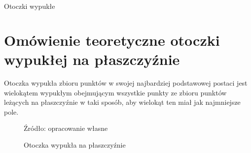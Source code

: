 \newcommand*{\includesDirectory}{includes}
\newcommand*{\settingsDirectory}{\includesDirectory/settings}
\newcommand*{\tikzDirectory}{\includesDirectory/tikz}
\newcommand*{\proovesDirectory}{\includesDirectory/prooves}
\newcommand*{\oneDirectory}{\proovesDirectory/one}
\newcommand*{\listingsDirectory}{\includesDirectory/listings}




















\newcommand{\alignspace}{\vspace{- 3pt}}
\setlength{\abovedisplayskip}{0ex}
\setlength{\belowdisplayskip}{0ex}
\setlength{\abovedisplayshortskip}{0ex}
\setlength{\belowdisplayshortskip}{0ex}
\setlength{\jot}{1.5ex}

    \thispagestyle{empty}
    \begin{center}
        \Huge{Otoczki wypukłe}
    \end{center}
    \tableofcontents	

  

    \chapter{Omówienie teoretyczne otoczki wypukłej na płaszczyźnie}
    Otoczka wypukła zbioru punktów w swojej najbardziej podstawowej postaci jest wielokątem wypukłym obejmującym wszystkie punkty ze zbioru punktów leżących na płaszczyźnie w taki sposób, aby wielokąt ten miał jak najmniejsze pole.    
    \begin{figure}[h!]
        	\begin{center}
    			
    			\caption{Otoczka wypukła na płaszczyźnie}\label{fig:example_hull}
    			
    			Źródło: opracowanie własne
    	\end{center}
    	\vspace{-0.8cm}
    \end{figure}
    
